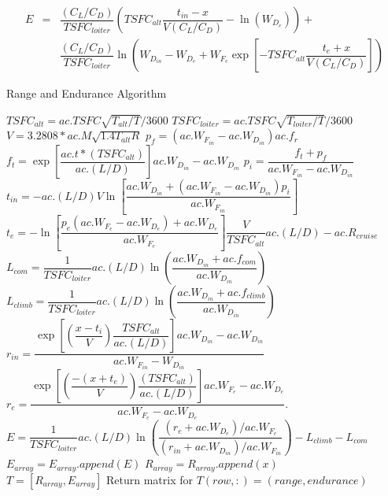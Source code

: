 \begin{eqnarray}
\label{eq:EnduranceWithRange}
    E & = &\dfrac{(C_L/C_D)}{TSFC_{loiter}}\left(TSFC_{alt}\dfrac{t_{in}-x}{V(C_L/C_D)}-\ln\left(W_{D_e}\right)\right) + \nonumber \\
    & &\dfrac{(C_L/C_D)}{TSFC_{loiter}}\ln\left(W_{D_{in}}-W_{D_e}+W_{F_e}\exp\left[-TSFC_{alt}\dfrac{t_e+x}{V(C_L/C_D)}\right]\right)
\end{eqnarray}
\begin{algorithm}
\caption{Range and Endurance Algorithm}
\label{Alg:R&E}
\begin{algorithmic}
\State $TSFC_{alt} = ac.TSFC\sqrt{T_{alt}/T}/3600$
\State $TSFC_{loiter} = ac.TSFC\sqrt{T_{loiter}/T}/3600$
\State $V = 3.2808*ac.M\sqrt{1.4T_{alt}R}$
\State $p_f = (ac.W_{F_{in}}-ac.W_{D_{in}})ac.f_r$
\State $f_t = \exp\left[\dfrac{ac.t*(TSFC_{alt})}{ac.(L/D)}\right]ac.W_{D_{in}}-ac.W_{D_{in}}$
\State $p_i = \dfrac{f_t + p_f}{ac.W_{F_{in}}-ac.W_{D_{in}}}$
\State $t_{in} = -ac.(L/D)V\ln\left[\dfrac{ac.W_{D_{in}}+(ac.W_{F_{in}}-ac.W_{D_{in}})p_i}{ac.W_{F_{in}}}\right]$
\State $t_e = -\ln\left[\dfrac{p_e(ac.W_{F_e}-ac.W_{D_e})+ac.W_{D_e}}{ac.W_{F_e}}\right]\dfrac{V}{TSFC_{alt}}ac.(L/D)-ac.R_{cruise}$
\State $L_{com} = \dfrac{1}{TSFC_{loiter}}ac.(L/D)\ln\left(\dfrac{ac.W_{D_{in}}+ac.f_{com}}{ac.W_{D_{in}}}\right)$
\State $L_{climb} = \dfrac{1}{TSFC_{loiter}}ac.(L/D)\ln\left(\dfrac{ac.W_{D_{in}}+ac.f_{climb}}{ac.W_{D_{in}}}\right)$
    \State $r_{in}=\dfrac{\exp\left[\left(\dfrac{x-t_i}{V}\right)\dfrac{TSFC_{alt}}{ac.(L/D)}\right]ac.W_{D_{in}}-ac.W_{D_{in}}}{ac.W_{F_{in}} - W_{D_{in}}}$
    \State $r_e = \dfrac{\exp\left[\left(\dfrac{-(x+t_e)}{V}\right)\dfrac{(TSFC_{alt})}{ac.(L/D)}\right]ac.W_{F_e}-ac.W_{D_e}}{ac.W_{F_e} - ac.W_{D_e}}.$
    \State $E = \dfrac{1}{TSFC_{loiter}}ac.(L/D)\ln\left(\dfrac{(r_e+ ac.W_{D_e})/ac.W_{F_e}}{(r_{in}+ac.W_{D_{in}})/ac.W_{F_{in}}}\right) - L_{climb}-L_{com}$
    \State $E_{array} = E_{array}.append(E)$
    \State $R_{array} = R_{array}.append(x)$
\EndFor\\
\Return $T = [R_{array}, E_{array}]$ \Comment Return matrix for $T(row,:) = (range,endurance)$
\end{algorithmic}
\end{algorithm}
